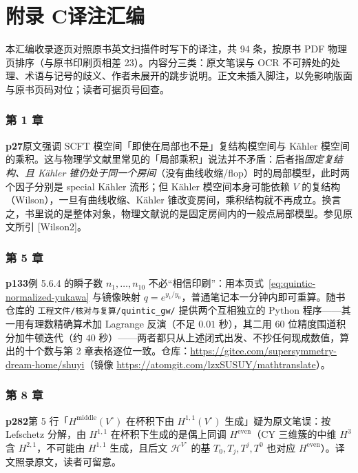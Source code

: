 \chapter*{附录 C\quad 译注汇编}

本汇编收录逐页对照原书英文扫描件时写下的译注，共 94 条，按原书 PDF 物理页排序（与原书印刷页相差 23）。内容分三类：原文笔误与 OCR 不可辨处的处理、术语与记号的歧义、作者未展开的跳步说明。正文未插入脚注，以免影响版面与原书页码对位；读者可据页号回查。


\subsection*{第 1 章}

\noindent\textbf{\footnotesize p27}\quad 原文强调 SCFT 模空间「即使在局部也不是」复结构模空间与 Kähler 模空间的乘积。这与物理学文献里常见的「局部乘积」说法并不矛盾：后者指\emph{固定复结构、且 Kähler 锥仍处于同一个房间}（没有曲线收缩/flop）时的局部模型，此时两个因子分别是 special Kähler 流形；但 Kähler 模空间本身可能依赖 $V$ 的复结构（Wilson），一旦有曲线收缩、Kähler 锥改变房间，乘积结构就不再成立。换言之，书里说的是整体对象，物理文献说的是固定房间内的一般点局部模型。参见原文所引 [Wilson2]。


\subsection*{第 5 章}

\noindent\textbf{\footnotesize p133}\quad 例 5.6.4 的瞬子数 $n_1,\dots,n_{10}$ 不必“相信印刷”：用本页式~\eqref{eq:quintic-normalized-yukawa} 与镜像映射 $q=e^{y_1/y_0}$，普通笔记本一分钟内即可重算。随书仓库的 \texttt{工程文件/核对与复算/quintic\_gw/} 提供两个互相独立的 Python 程序——其一用有理数精确算术加 Lagrange 反演（不足 $0.01$ 秒），其二用 $60$ 位精度围道积分加牛顿迭代（约 $40$ 秒）——两者都只从上述闭式出发、不抄任何现成数值，算出的十个数与第 2 章表格逐位一致。仓库：\url{https://gitee.com/supersymmetry-dream-home/shuyi}（镜像 \url{https://atomgit.com/lzxSUSUY/mathtranslate}）。


\subsection*{第 8 章}

\noindent\textbf{\footnotesize p282}\quad 第 5 行「$H^{\mathrm{middle}}(V^\circ)$ 在杯积下由 $H^{1,1}(V^\circ)$ 生成」疑为原文笔误：按 Lefschetz 分解，由 $H^{1,1}$ 在杯积下生成的是偶上同调 $H^{\mathrm{even}}$（CY 三维簇的中维 $H^3$ 含 $H^{2,1}$，不可能由 $H^{1,1}$ 生成，且后文 $\mathcal H^{V^\circ}$ 的基 $T_0,T_j,T^j,T^0$ 也对应 $H^{\mathrm{even}}$）。译文照录原文，读者可留意。


